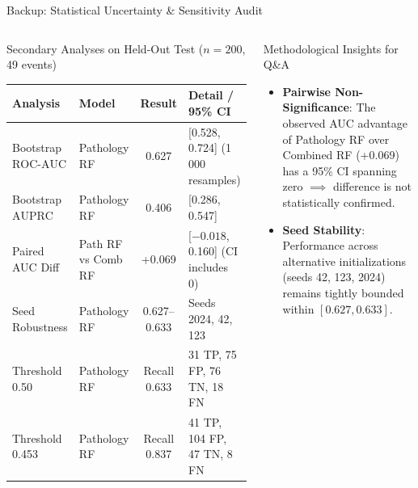 \documentclass[10pt,aspectratio=169,xcolor={table,dvipsnames}]{beamer}
\newcommand{\ROC}{\text{ROC-AUC}}
\newcommand{\AUPRC}{\text{AUPRC}}
\begin{document}
\begin{frame}[noframenumbering]{Backup: Statistical Uncertainty \& Sensitivity Audit}
  \begin{columns}[t]
      \begin{block}{\scriptsize Secondary Analyses on Held-Out Test ($n=200$, 49 events)}
        \centering
        \tiny
        \begin{tabular*}{\linewidth}{@{\extracolsep{\fill}}llcl@{}}
          \toprule
          \textbf{Analysis} & \textbf{Model} & \textbf{Result} & \textbf{Detail / 95\% CI} \\
          \midrule
          Bootstrap $\ROC$ & Pathology RF & 0.627 & [0.528, 0.724] (1\,000 resamples) \\
          Bootstrap $\AUPRC$ & Pathology RF & 0.406 & [0.286, 0.547] \\
          Paired AUC Diff & Path RF vs Comb RF & +0.069 & [$-0.018$, 0.160] (CI includes 0) \\
          Seed Robustness & Pathology RF & 0.627--0.633 & Seeds 2024, 42, 123 \\
          \midrule
          Threshold 0.50 & Pathology RF & Recall 0.633 & 31 TP, 75 FP, 76 TN, 18 FN \\
          Threshold 0.453 & Pathology RF & Recall 0.837 & 41 TP, 104 FP, 47 TN, 8 FN \\
          \bottomrule
        \end{tabular*}
      \end{block}

      \begin{alertblock}{\scriptsize Methodological Insights for Q\&A}
        \begin{itemize}\setlength{\itemsep}{1pt}
          \item {\tiny \textbf{Pairwise Non-Significance}: The observed AUC advantage of Pathology RF over Combined RF (+0.069) has a 95\% CI spanning zero $\implies$ difference is not statistically confirmed.}
          \item {\tiny \textbf{Seed Stability}: Performance across alternative initializations (seeds 42, 123, 2024) remains tightly bounded within $[0.627, 0.633]$.}
        \end{itemize}
      \end{alertblock}
  \end{columns}
\end{frame}
\end{document}
